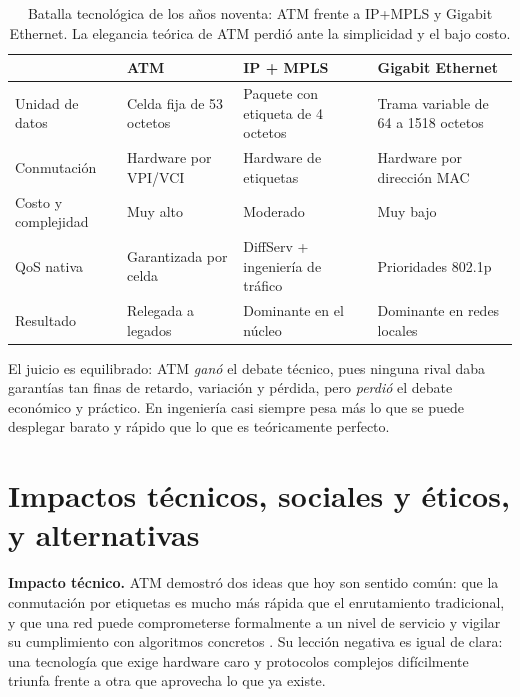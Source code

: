 \documentclass[12pt,a4paper]{article}
\begin{document}
\begin{table}[h]
    \centering
    \small
    \begin{tabularx}{\textwidth}{l X X X}
        \toprule
        & \textbf{ATM} & \textbf{IP + MPLS} & \textbf{Gigabit Ethernet} \\
        \midrule
        Unidad de datos & Celda fija de 53 octetos & Paquete con etiqueta de 4 octetos & Trama variable de 64 a 1518 octetos \\
        Conmutación & Hardware por VPI/VCI & Hardware de etiquetas & Hardware por dirección MAC \\
        Costo y complejidad & Muy alto & Moderado & Muy bajo \\
        QoS nativa & Garantizada por celda & DiffServ + ingeniería de tráfico & Prioridades 802.1p \\
        Resultado & Relegada a legados & Dominante en el núcleo & Dominante en redes locales \\
        \bottomrule
    \end{tabularx}
    \caption{Batalla tecnológica de los años noventa: ATM frente a IP+MPLS y Gigabit Ethernet. La elegancia teórica de ATM perdió ante la simplicidad y el bajo costo.}
    \label{tab:comparacion}
\end{table}

El juicio es equilibrado: ATM \emph{ganó} el debate técnico, pues ninguna rival daba garantías tan finas de retardo, variación y pérdida, pero \emph{perdió} el debate económico y práctico. En ingeniería casi siempre pesa más lo que se puede desplegar barato y rápido que lo que es teóricamente perfecto.

\section{Impactos técnicos, sociales y éticos, y alternativas}

\textbf{Impacto técnico.} ATM demostró dos ideas que hoy son sentido común: que la conmutación por etiquetas es mucho más rápida que el enrutamiento tradicional, y que una red puede comprometerse formalmente a un nivel de servicio y vigilar su cumplimiento con algoritmos concretos \cite{chao2001}. Su lección negativa es igual de clara: una tecnología que exige hardware caro y protocolos complejos difícilmente triunfa frente a otra que aprovecha lo que ya existe.
\end{document}
